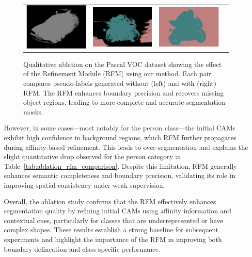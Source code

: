 \begin{figure}[H]
{\begin{minipage}{0.98\linewidth}
\begin{tabular}{c c c c}
        \includegraphics[width=0.18\linewidth, height=0.18\linewidth]{figures/ablation/withrfm/2010_003276_[6]} & \hspace{2pt}
        \includegraphics[width=0.18\linewidth, height=0.18\linewidth]{figures/ablation/withoutrfm/2009_000074_[13, 14]} &
        \includegraphics[width=0.18\linewidth, height=0.18\linewidth]{figures/ablation/withrfm/2009_000074_[13, 14]} \\
      \end{tabular}
    \end{minipage}
  }

  \caption{Qualitative ablation on the Pascal VOC dataset showing the effect of the Refinement Module (RFM) \cite{wsss_frozen_clip} using our method. Each pair compares pseudo-labels generated without (left) and with (right) RFM. The RFM enhances boundary precision and recovers missing object regions, leading to more complete and accurate segmentation masks.}
  \label{fig:qualitative_ablation}
\end{figure}

However, in some cases—most notably for the person class—the initial CAMs exhibit high confidence in background regions, which RFM further propagates during affinity-based refinement. This leads to over-segmentation and explains the slight quantitative drop observed for the person category in Table~\ref{tab:ablation_rfm_comparison}. Despite this limitation, RFM generally enhances semantic completeness and boundary precision, validating its role in improving spatial consistency under weak supervision.

Overall, the ablation study confirms that the RFM effectively enhances segmentation quality by refining initial CAMs using affinity information and contextual cues, particularly for classes that are underrepresented or have complex shapes. These results establish a strong baseline for subsequent experiments and highlight the importance of the RFM in improving both boundary delineation and class-specific performance.
